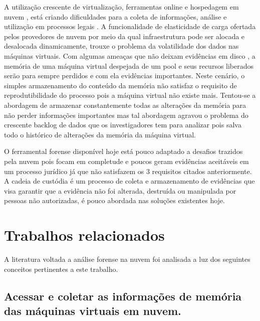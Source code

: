 \documentclass[conference]{IEEEtran}
\begin{document}
A utilização crescente de virtualização, ferramentas online e hospedagem em nuvem \cite{Amazon2016}, está criando dificuldades para a coleta de informações, análise e 
utilização em processos legais \cite{Sharma2012}. A funcionalidade de elasticidade de carga ofertada pelos provedores de nuvem por meio da qual infraestrutura pode ser
alocada e desalocada dinamicamente, trouxe o problema da volatilidade dos dados nas máquinas virtuais. Com algumas ameaças que não deixam evidências em disco \cite{Rafique2013},
a memória de uma máquina virtual despejada de um pool e seus recursos liberados serão para sempre perdidos e com ela evidências importantes. Neste cenário, o simples 
armazenamento do conteúdo da memória não satisfaz o requisito de reprodutibilidade do processo pois a máquina virtual não existe mais. Tentou-se a abordagem de armazenar 
constantemente todas as alterações da memória para não perder informações importantes mas tal abordagem agravou o problema do crescente backlog de dados que os investigadores 
tem para analizar \cite{Quick2014} pois salva todo o histórico de alterações da memória da máquina virtual.

O ferramental forense disponível hoje está pouco adaptado a desafios trazidos pela nuvem \cite{Dykstra2012a} pois focam em completude e poucos geram evidências aceitáveis em
um processo jurídico \cite{Reichert2015} já que não satisfazem os 3 requisitos citados anteriormente. A cadeia de custódia é um processo de coleta e armazenamento de evidências
que visa garantir que a evidência não foi alterada, destruída ou manipulada por pessoas não autorizadas, é pouco abordada nas soluções existentes hoje.

\section{Trabalhos relacionados}

A literatura voltada a análise forense na nuvem foi analisada a luz dos seguintes conceitos pertinentes a este trabalho. 

\subsection{Acessar e coletar as informações de memória das máquinas virtuais em nuvem.}
\end{document}
